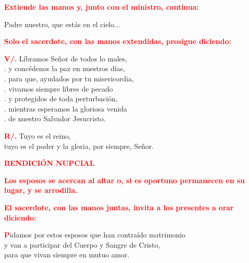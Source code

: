 \documentclass[12pt, letterpaper]{report}
\begin{document}
\large{\bfseries \textcolor{red}{Extiende las manos y, junto con el ministro, continua:}}\newline

\Large Padre nuestro, que est\'as en el cielo...\newline

\large{\bfseries \textcolor{red}{Solo el sacerdote, con las manos extendidas, prosigue diciendo:}}\newline

\Large \hspace{-0.9cm} {\bfseries \textcolor{red}{V/.}} \hspace{0.5cm} L\'ibramos Se\~nor de todos lo males,\\
. \hspace{1cm} y conc\'edenos la paz en nuestros d\'ias,\\
. \hspace{1cm} para que, ayudados por tu misericordia,\\
. \hspace{1cm} vivamos siempre libres de pecado\\
. \hspace{1cm} y protegidos de toda perturbaci\'on,\\
. \hspace{1cm} mientras esperamos la gloriosa venida\\
. \hspace{1cm} de nuestro Salvador Jesucristo.\newline

\Large \hspace{-0.9cm} {\bfseries \textcolor{red}{R/.}} \hspace{0.5cm} Tuyo es el reino,\\
tuyo es el poder y la gloria, por siempre, Se\~nor. \newline


\Large {\bfseries \textcolor{red}{BENDICI\'ON NUPCIAL}} \newline

\large{\bfseries \textcolor{red}{Los esposos se acercan al altar o,
si es oportuno permanecen en su lugar, y se arrodilla.}}\newline

\large{\bfseries \textcolor{red}{El sacerdote, con las manos juntas, invita a los presentes a orar diciendo:}}

\lettrine[lines=1]{\bfseries \textcolor{red}{P}}{}\Large idamos por estos esposos que han contra\'ido matrimonio \\
y van a participar del Cuerpo y Sangre de Cristo, \\
para que vivan siempre en mutuo amor.\newline
\end{document}
